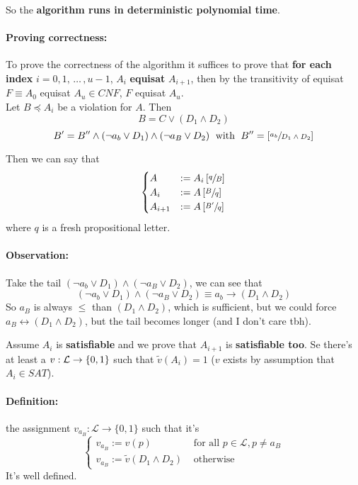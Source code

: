 	So the \textbf{algorithm runs in deterministic polynomial time}.\\

	\paragraph{Proving correctness:} To prove the correctness of the algorithm it suffices to prove that \textbf{for each index} $i = 0,1, \, \dots \, , u-1$, $A_i$ \textbf{equisat} $A_{i+1}$, then by the transitivity of equisat $F \equiv A_0$ equisat $A_u \in CNF$, $F$ equisat $A_u$.\\

	Let $B \preceq A_i$ be a violation for $A$. Then \\
	$$ B = C \vee (D_1 \wedge D_2) $$
	$$ B' = B'' \wedge (\neg a_b \vee D_1) \wedge (\neg a_B \vee D_2) \; \text{ with } \; B'' = \left[\sfrac{a_b}{D_1 \wedge D_2}\right] $$

	Then we can say that
	$$
	\begin{cases}
		A & := A_i \left[\sfrac{q}{B}\right] \\
		A_i & := A \left[\sfrac{B}{q}\right] \\
		A_{i+1} & := A \left[\sfrac{B'}{q}\right]
	\end{cases}
	$$
	where $q$ is a fresh propositional letter.\\

	\paragraph{Observation:} Take the tail $(\neg a_b \vee D_1) \wedge (\neg a_B \vee D_2)$, we can see that
	$$  (\neg a_b \vee D_1) \wedge (\neg a_B \vee D_2) \equiv a_b \rightarrow (D_1 \wedge D_2) $$
	So $a_B$ is always $\leq$ than $(D_1 \wedge D_2)$, which is sufficient, but we could force $a_B \leftrightarrow (D_1 \wedge D_2)$, but the tail becomes longer (and I don't care tbh).

	\newpage

	Assume $A_i$ is \textbf{satisfiable} and we prove that $A_{i+1}$ is \textbf{satisfiable too}. Se there's at least a $v: \mathcal{L} \rightarrow \{0,1\}$ such that $\tilde v (A_i) = 1$ ($v$ exists by assumption that $A_i \in SAT$).\\

	\paragraph{Definition:} the assignment $v_{a_B}: \mathcal{L} \rightarrow \{0,1\}$ such that it's
	$$
	\begin{cases}
		v_{a_B} := v(p) & \text{ for all } p \in \mathcal{L}, p \neq a_B \\
		v_{a_B} := \tilde v (D_1 \wedge D_2) & \text{ otherwise }
	\end{cases}
	$$
	It's well defined.\\

